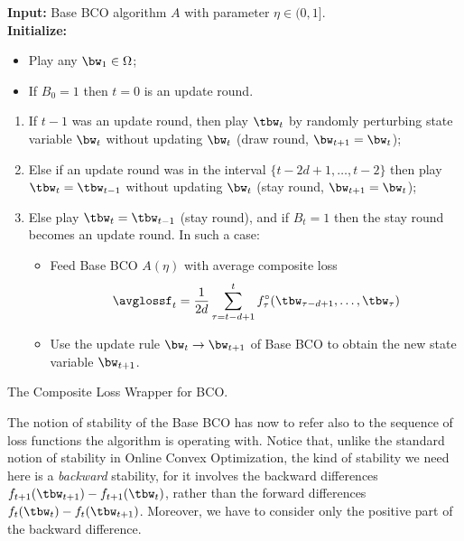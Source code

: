 \begin{algorithm2e}[t]
 
\textbf{Input:} Base BCO algorithm $A$ with parameter $\eta \in (0,1]$.\\%
\textbf{Initialize:}
\begin{itemize}[topsep=0pt,parsep=0pt,itemsep=0pt]
\item Play any $\bw_1 \in \Omega$;
\item If $B_0 = 1$ then $t=0$ is an update round.
\end{itemize}
%
 { {
\begin{enumerate}[topsep=0pt,parsep=0pt,itemsep=0pt]
\item If $t-1$ was an update round, then play $\tbw_t$ by randomly perturbing state variable $\bw_t$ without updating $\bw_t$ (draw round, $\bw_{t+1} = \bw_t$);
\item Else if an update round was in the interval $\{t-2d+1, \dots,t-2\}$ then play $\tbw_t = \tbw_{t-1}$ without updating $\bw_t$
(stay round, $\bw_{t+1} = \bw_t$);
\item Else play $\tbw_t = \tbw_{t-1}$ (stay round), and if $B_t=1$ then the stay round becomes an update round. In such a case:
%
\begin{itemize}[topsep=0pt,parsep=0pt,itemsep=0pt]
\item Feed Base BCO $A(\eta)$ with average composite loss
%
\[
\avglossf_t = \frac{1}{2d}\sum_{\tau=t-d+1}^t \fcomp_\tau(\tbw_{\tau-d+1},\dots,\tbw_{\tau})
\] 
\item Use the update rule $\bw_t\rightarrow \bw_{t+1}$ of Base BCO to obtain the new state variable $\bw_{t+1}$. 
\end{itemize}
\end{enumerate}
} } \caption{The Composite Loss Wrapper for BCO.}
\label{a:delayed-bco}
\end{algorithm2e}
%
The notion of stability of the Base BCO has now to refer also to the sequence of loss functions the algorithm is operating with. Notice that, unlike the standard notion of stability in Online Convex Optimization, the kind of stability we need here is a {\em backward} stability, for it involves the backward differences $f_{t+1}(\tbw_{t+1}) - f_{t+1}(\tbw_t)$, rather than the forward differences $f_{t}(\tbw_{t}) - f_{t}(\tbw_{t+1})$. Moreover, we have to consider only the positive part of the backward difference.
